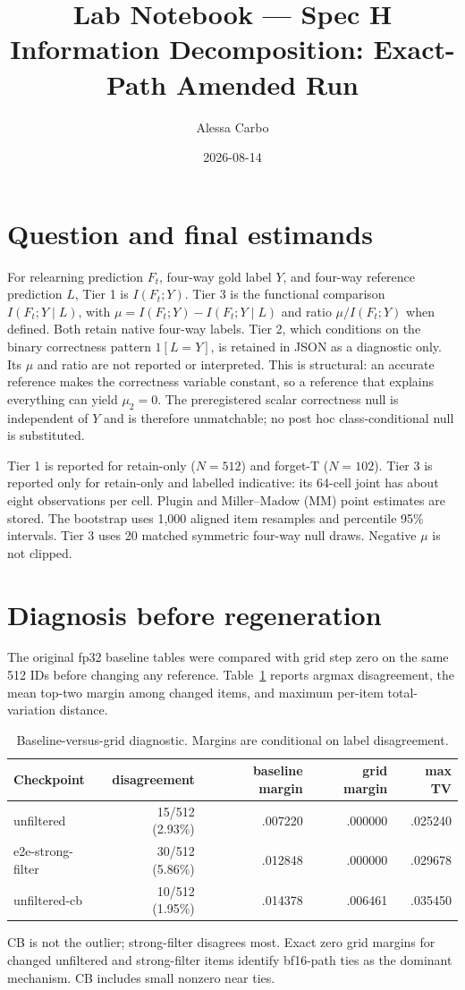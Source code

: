 \documentclass[11pt]{article}
\title{Lab Notebook --- Spec H Information Decomposition: Exact-Path Amended Run}
\author{Alessa Carbo}
\date{2026-08-14}
\begin{document}
\maketitle

\section{Question and final estimands}
For relearning prediction $F_t$, four-way gold label $Y$, and four-way
reference prediction $L$, Tier 1 is $I(F_t;Y)$.  Tier 3 is the functional
comparison $I(F_t;Y\mid L)$, with
$\mu=I(F_t;Y)-I(F_t;Y\mid L)$ and ratio $\mu/I(F_t;Y)$ when defined.
Both retain native four-way labels.  Tier 2, which conditions on the binary
correctness pattern $1[L=Y]$, is retained in JSON as a diagnostic only.
Its $\mu$ and ratio are not reported or interpreted. This is structural: an accurate reference makes the correctness variable constant, so a reference that explains everything can yield $\mu_2=0$. The preregistered scalar correctness null is independent of $Y$ and is therefore unmatchable; no post hoc class-conditional null is substituted.

Tier 1 is reported for retain-only ($N=512$) and forget-T ($N=102$).
Tier 3 is reported only for retain-only and labelled indicative: its
64-cell joint has about eight observations per cell.  Plugin and
Miller--Madow (MM) point estimates are stored.  The bootstrap uses 1,000
aligned item resamples and percentile 95\% intervals.  Tier 3 uses 20
matched symmetric four-way null draws.  Negative $\mu$ is not clipped.

\section{Diagnosis before regeneration}
The original fp32 baseline tables were compared with grid step zero on the
same 512 IDs before changing any reference.  Table~\ref{tab:disagree} reports
argmax disagreement, the mean top-two margin among changed items, and maximum
per-item total-variation distance.
\begin{table}[h]
\centering
\begin{tabular}{lrrrr}
\toprule
Checkpoint & disagreement & baseline margin & grid margin & max TV\\
\midrule
unfiltered & 15/512 (2.93\%) & .007220 & .000000 & .025240\\
e2e-strong-filter & 30/512 (5.86\%) & .012848 & .000000 & .029678\\
unfiltered-cb & 10/512 (1.95\%) & .014378 & .006461 & .035450\\
\bottomrule
\end{tabular}
\caption{Baseline-versus-grid diagnostic. Margins are conditional on label
disagreement.}\label{tab:disagree}
\end{table}
CB is not the outlier; strong-filter disagrees most.  Exact zero grid margins
for changed unfiltered and strong-filter items identify bf16-path ties as the
dominant mechanism.  CB includes small nonzero near ties.
\end{document}
